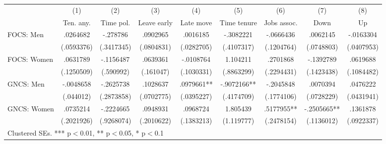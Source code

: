 \begin{adjustbox}{max width=\textwidth}
\begin{tabular}{lcccccccc}
\toprule
 & (1) & (2) & (3) & (4) & (5) & (6) & (7) & (8) \\
 & Ten. any. & Time pol. & Leave early & Late move & Time tenure & Jobs assoc. & Down & Up \\
\midrule
FOCS: Men & .0264682 & -.278786 & .0902965 & .0016185 & -.3082221 & -.0666436 & .0062145 & -.0163304 \\
 & (.0593376) & (.3417345) & (.0804831) & (.0282705) & (.4107317) & (.1204764) & (.0748803) & (.0407953) \\[0.3em]
FOCS: Women & .0631789 & -.1156487 & .0639361 & -.0108764 & 1.104211 & .2701868 & -.1392789 & .0619688 \\
 & (.1250509) & (.590992) & (.161047) & (.1030331) & (.8863299) & (.2294431) & (.1423438) & (.1084482) \\[0.3em]
GNCS: Men & -.0048658 & -.2625738 & .1028637 & .0979661** & -.9072166** & -.2045848 & .0070394 & .0476222 \\
 & (.044012) & (.2873858) & (.0702775) & (.0395227) & (.4174709) & (.1774106) & (.0728229) & (.0431941) \\[0.3em]
GNCS: Women & .0735214 & -.2224665 & .0948931 & .0968724 & 1.805439 & .5177955** & -.2505665** & .1361878 \\
 & (.2021926) & (.9268074) & (.2010622) & (.1383213) & (1.119777) & (.2478154) & (.1136012) & (.0922337) \\[0.3em]
\bottomrule
\multicolumn{9}{l}{\footnotesize Clustered SEs. *** p$<$0.01, ** p$<$0.05, * p$<$0.1} \\
\end{tabular}
\end{adjustbox}
